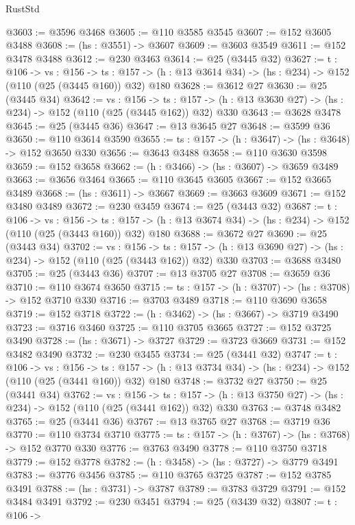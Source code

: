 \begin{lexlean}{RustStd}
\begin{coremodule}
@3603 := @3596 @3468
@3605 := @110 @3585 @3545
@3607 := @152 @3605 @3488
@3608 := (hs : @3551) -> @3607
@3609 := @3603 @3549
@3611 := @152 @3478 @3488
@3612 := @230 @3463
@3614 := @25 (@3445 @32)
@3627 := {t : @106} ->
  {vs : @156} ->
  {ts : @157} -> (h : @13 @3614 @34) -> (hs : @234) -> @152 (@110 (@25 (@3445 @160)) @32) @180
@3628 := @3612 @27
@3630 := @25 (@3445 @34)
@3642 := {vs : @156} ->
  {ts : @157} -> (h : @13 @3630 @27) -> (hs : @234) -> @152 (@110 (@25 (@3445 @162)) @32) @330
@3643 := @3628 @3478
@3645 := @25 (@3445 @36)
@3647 := @13 @3645 @27
@3648 := @3599 @36
@3650 := @110 @3614 @3590
@3655 := {ts : @157} -> (h : @3647) -> (hs : @3648) -> @152 @3650 @330
@3656 := @3643 @3488
@3658 := @110 @3630 @3598
@3659 := @152 @3658
@3662 := (h : @3466) -> (hs : @3607) -> @3659 @3489
@3663 := @3656 @3464
@3665 := @110 @3645 @3605
@3667 := @152 @3665 @3489
@3668 := (hs : @3611) -> @3667
@3669 := @3663 @3609
@3671 := @152 @3480 @3489
@3672 := @230 @3459
@3674 := @25 (@3443 @32)
@3687 := {t : @106} ->
  {vs : @156} ->
  {ts : @157} -> (h : @13 @3674 @34) -> (hs : @234) -> @152 (@110 (@25 (@3443 @160)) @32) @180
@3688 := @3672 @27
@3690 := @25 (@3443 @34)
@3702 := {vs : @156} ->
  {ts : @157} -> (h : @13 @3690 @27) -> (hs : @234) -> @152 (@110 (@25 (@3443 @162)) @32) @330
@3703 := @3688 @3480
@3705 := @25 (@3443 @36)
@3707 := @13 @3705 @27
@3708 := @3659 @36
@3710 := @110 @3674 @3650
@3715 := {ts : @157} -> (h : @3707) -> (hs : @3708) -> @152 @3710 @330
@3716 := @3703 @3489
@3718 := @110 @3690 @3658
@3719 := @152 @3718
@3722 := (h : @3462) -> (hs : @3667) -> @3719 @3490
@3723 := @3716 @3460
@3725 := @110 @3705 @3665
@3727 := @152 @3725 @3490
@3728 := (hs : @3671) -> @3727
@3729 := @3723 @3669
@3731 := @152 @3482 @3490
@3732 := @230 @3455
@3734 := @25 (@3441 @32)
@3747 := {t : @106} ->
  {vs : @156} ->
  {ts : @157} -> (h : @13 @3734 @34) -> (hs : @234) -> @152 (@110 (@25 (@3441 @160)) @32) @180
@3748 := @3732 @27
@3750 := @25 (@3441 @34)
@3762 := {vs : @156} ->
  {ts : @157} -> (h : @13 @3750 @27) -> (hs : @234) -> @152 (@110 (@25 (@3441 @162)) @32) @330
@3763 := @3748 @3482
@3765 := @25 (@3441 @36)
@3767 := @13 @3765 @27
@3768 := @3719 @36
@3770 := @110 @3734 @3710
@3775 := {ts : @157} -> (h : @3767) -> (hs : @3768) -> @152 @3770 @330
@3776 := @3763 @3490
@3778 := @110 @3750 @3718
@3779 := @152 @3778
@3782 := (h : @3458) -> (hs : @3727) -> @3779 @3491
@3783 := @3776 @3456
@3785 := @110 @3765 @3725
@3787 := @152 @3785 @3491
@3788 := (hs : @3731) -> @3787
@3789 := @3783 @3729
@3791 := @152 @3484 @3491
@3792 := @230 @3451
@3794 := @25 (@3439 @32)
@3807 := {t : @106} ->

\end{coremodule}
\end{lexlean}
